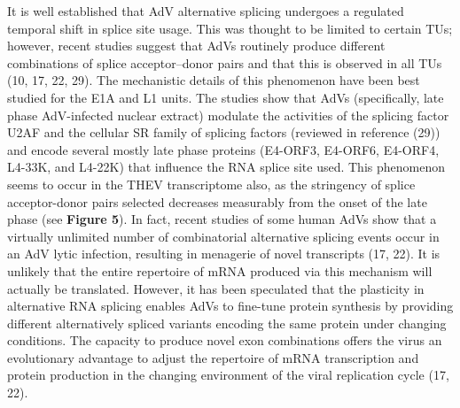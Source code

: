 \documentclass[
]{article}
\begin{document}
It is well established that AdV alternative splicing undergoes a
regulated temporal shift in splice site usage. This was thought to be
limited to certain TUs; however, recent studies suggest that AdVs
routinely produce different combinations of splice acceptor--donor pairs
and that this is observed in all TUs (10, 17, 22, 29). The mechanistic
details of this phenomenon have been best studied for the E1A and L1
units. The studies show that AdVs (specifically, late phase AdV-infected
nuclear extract) modulate the activities of the splicing factor U2AF and
the cellular SR family of splicing factors (reviewed in reference (29))
and encode several mostly late phase proteins (E4-ORF3, E4-ORF6,
E4-ORF4, L4-33K, and L4-22K) that influence the RNA splice site used.
This phenomenon seems to occur in the THEV transcriptome also, as the
stringency of splice acceptor-donor pairs selected decreases measurably
from the onset of the late phase (see \textbf{Figure 5}). In fact,
recent studies of some human AdVs show that a virtually unlimited number
of combinatorial alternative splicing events occur in an AdV lytic
infection, resulting in menagerie of novel transcripts (17, 22). It is
unlikely that the entire repertoire of mRNA produced via this mechanism
will actually be translated. However, it has been speculated that the
plasticity in alternative RNA splicing enables AdVs to fine-tune protein
synthesis by providing different alternatively spliced variants encoding
the same protein under changing conditions. The capacity to produce
novel exon combinations offers the virus an evolutionary advantage to
adjust the repertoire of mRNA transcription and protein production in
the changing environment of the viral replication cycle (17, 22).
\end{document}
